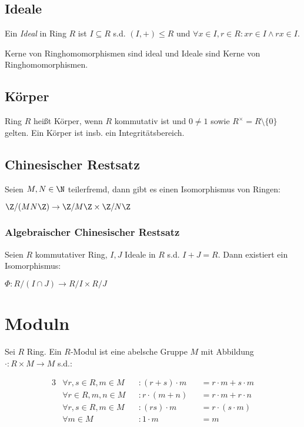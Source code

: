 \subsection*{Ideale}

Ein \emph{Ideal} in Ring $R$ ist $I \subseteq R$ s.d. $(I,+) \leq R$ und $\forall x \in I, r \in R : xr \in I \land rx \in I$.

Kerne von Ringhomomorphismen sind ideal und Ideale sind Kerne von Ringhomomorphismen.

\subsection*{Körper}

Ring $R$ heißt Körper, wenn $R$ kommutativ ist und $0 \neq 1$ sowie $R^\times = R \setminus \{0\}$ gelten. Ein Körper ist insb. ein Integritätsbereich.

\subsection*{Chinesischer Restsatz}

Seien $M, N \in \N$ teilerfremd, dann gibt es einen Isomorphismus von Ringen:

$\Z/(MN\Z) \to \Z/M\Z \times \Z/N\Z$

\subsubsection*{Algebraischer Chinesischer Restsatz}

Seien $R$ kommutativer Ring, $I, J$ Ideale in $R$ s.d. $I + J = R$. Dann existiert ein Isomorphismus:

$\Phi : R/(I \cap J) \to R/I \times R/J$

\section*{Moduln}

Sei $R$ Ring. Ein $R$-Modul ist eine abelsche Gruppe $M$ mit Abbildung $\cdot : R \times M \to M$ s.d.:

\vspace*{-4mm}
\begin{alignat*}{3}
	&\forall r, s \in R, m \in M &&: (r+s)\cdot m &&= r\cdot m + s\cdot m \\
	&\forall r \in R, m, n \in M &&: r \cdot (m+n) &&= r\cdot m + r\cdot n \\
	&\forall r, s \in R, m \in M &&: (rs)\cdot m &&= r\cdot(s\cdot m) \\
	&\forall m \in M &&: 1\cdot m &&= m
\end{alignat*}

